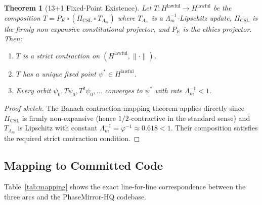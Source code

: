 \documentclass[12pt,a4paper]{article}
\theoremstyle{plain}
\newtheorem{theorem}{Theorem}[section]
\theoremstyle{definition}
\newcommand{\Hlawful}{H^{\mathrm{lawful}}}
\newcommand{\PiCSL}{\Pi_{\mathrm{CSL}}}
\newcommand{\Lambdam}{\Lambda_m}
\begin{document}
\begin{theorem}[13+1 Fixed-Point Existence]
\label{thm:fixedpoint}
Let $T : \Hlawful \to \Hlawful$ be the composition $T = P_E \circ (\PiCSL \circ T_{\Lambdam})$
where $T_{\Lambdam}$ is a $\Lambdam^{-1}$-Lipschitz update, $\PiCSL$ is the firmly
non-expansive constitutional projector, and $P_E$ is the ethics projector.  Then:
\begin{enumerate}[label=(\roman*)]
  \item $T$ is a strict contraction on $(\Hlawful, \|\cdot\|)$.
  \item $T$ has a unique fixed point $\psi^* \in \Hlawful$.
  \item Every orbit $\psi_0, T\psi_0, T^2\psi_0, \ldots$ converges to $\psi^*$
        with rate $\Lambdam^{-1} < 1$.
\end{enumerate}
\end{theorem}
\begin{proof}[Proof sketch]
The Banach contraction mapping theorem applies directly since $\PiCSL$ is firmly
non-expansive (hence $1/2$-contractive in the standard sense) and $T_{\Lambdam}$ is
Lipschitz with constant $\Lambdam^{-1} = \varphi^{-1} \approx 0.618 < 1$.  Their
composition satisfies the required strict contraction condition.
\end{proof}

\subsection{Mapping to Committed Code}
\label{sec:strata:code}

Table~\ref{tab:mapping} shows the exact line-for-line correspondence between the
three arcs and the PhaseMirror-HQ codebase.
\end{document}
